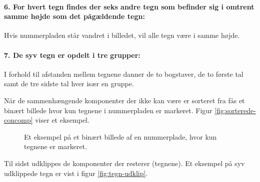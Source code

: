 \paragraph{6. For hvert tegn findes der seks andre tegn som befinder sig i omtrent samme højde som det pågældende tegn:} Hvis nummerpladen står vandret i billedet, vil alle tegn være i samme højde.
\paragraph{7. De syv tegn er opdelt i tre grupper:} I forhold til afstanden mellem tegnene danner de to bogstaver, de to første tal samt de tre sidste tal hver især en gruppe.



Når de sammenhængende komponenter der ikke kan være er sorteret fra fås et binært billede hvor kun tegnene i nummerpladen er markeret. Figur \vref{fig:sorterede-concomp} viser et eksempel.

\begin{figure}[htp]
  \centering
  \caption{Et eksempel på et binært billede af en nummerplade, hvor kun tegnene er markeret.}
  \label{fig:sorterede-concomp}
\end{figure}

Til sidst udklippes de komponenter der resterer (tegnene). Et eksempel på syv udklippede tegn er vist i figur \vref{fig:tegn-udklip}.

